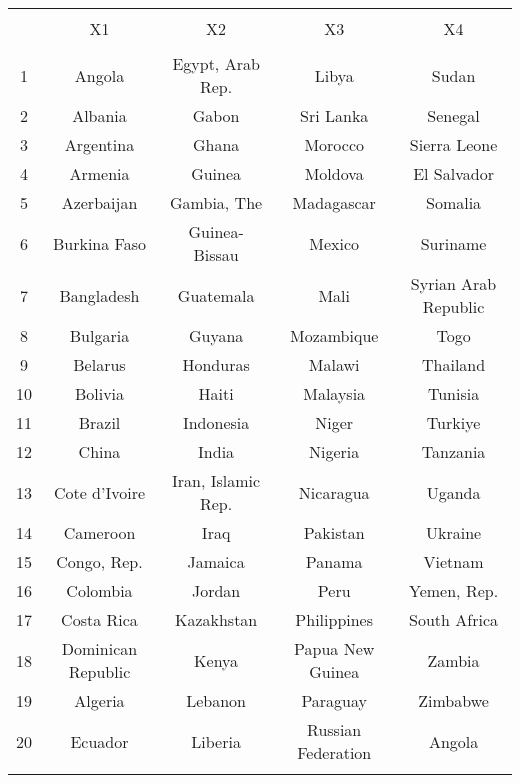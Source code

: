 
\begin{table}[!htbp] \centering 
  \caption{} 
  \label{} 
\begin{tabular}{@{\extracolsep{5pt}} ccccc} 
\\[-1.8ex]\hline 
\hline \\[-1.8ex] 
 & X1 & X2 & X3 & X4 \\ 
\hline \\[-1.8ex] 
1 & Angola & Egypt, Arab Rep. & Libya & Sudan \\ 
2 & Albania & Gabon & Sri Lanka & Senegal \\ 
3 & Argentina & Ghana & Morocco & Sierra Leone \\ 
4 & Armenia & Guinea & Moldova & El Salvador \\ 
5 & Azerbaijan & Gambia, The & Madagascar & Somalia \\ 
6 & Burkina Faso & Guinea-Bissau & Mexico & Suriname \\ 
7 & Bangladesh & Guatemala & Mali & Syrian Arab Republic \\ 
8 & Bulgaria & Guyana & Mozambique & Togo \\ 
9 & Belarus & Honduras & Malawi & Thailand \\ 
10 & Bolivia & Haiti & Malaysia & Tunisia \\ 
11 & Brazil & Indonesia & Niger & Turkiye \\ 
12 & China & India & Nigeria & Tanzania \\ 
13 & Cote d'Ivoire & Iran, Islamic Rep. & Nicaragua & Uganda \\ 
14 & Cameroon & Iraq & Pakistan & Ukraine \\ 
15 & Congo, Rep. & Jamaica & Panama & Vietnam \\ 
16 & Colombia & Jordan & Peru & Yemen, Rep. \\ 
17 & Costa Rica & Kazakhstan & Philippines & South Africa \\ 
18 & Dominican Republic & Kenya & Papua New Guinea & Zambia \\ 
19 & Algeria & Lebanon & Paraguay & Zimbabwe \\ 
20 & Ecuador & Liberia & Russian Federation & Angola \\ 
\hline \\[-1.8ex] 
\end{tabular} 
\end{table} 
